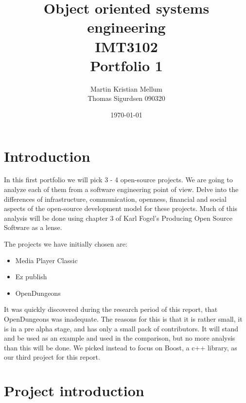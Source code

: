 \documentclass{report} %
\title{Object oriented systems engineering \\ IMT3102 \\ Portfolio 1}
\author{Martin Kristian Mellum  \\ Thomas Sigurdsen 090320} %
\date{\today}
\begin{document}
\maketitle       %
\tableofcontents %
\pagebreak	%

\section{Introduction} %
In this first portfolio we will pick 3 - 4 open-source projects. We are going to analyze each of them from a software engineering point of view. Delve into the differences of infrastructure, communication, openness, financial and social aspects of the open-source development model for these projects. Much of this analysis will be done using chapter 3 of Karl Fogel's Producing Open Source Software\cite{kfposs} as a lense.

The projects we have initially chosen are:
\begin{itemize}
\item Media Player Classic\cite{mpcweb}
\item Ez publish\cite{ezpubweb}
\item OpenDungeons\cite{odweb} %
\end{itemize}
It was quickly discovered during the research period of this report, that OpenDungeons was inadequate. The reasons for this is that it is rather small, it is in a pre alpha stage, and has only a small pack of contributors. It will stand and be used as an example and used in the comparison, but no more analysis than this will be done. We picked instead to focus on Boost\cite{boostweb}, a c++ library, as our third project for this report.

\section{Project introduction}
\end{document}
